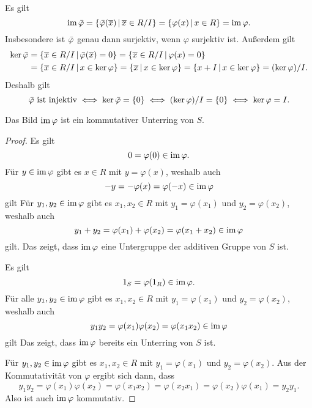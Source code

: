 \subsection{}

Es gilt
\[
    \operatorname{im} \bar{\varphi}
  = \{ \bar{\varphi}(\overline{x}) \,|\, \overline{x} \in R/I \}
  = \{ \varphi(x) \,|\, x \in R \}
  = \operatorname{im} \varphi.
\]
Insbesondere ist $\bar{\varphi}$ genau dann surjektiv, wenn $\varphi$ surjektiv ist.
Außerdem gilt
\begin{align*}
      \ker \bar{\varphi}
  &=  \{ \overline{x} \in R/I \,|\, \bar{\varphi}( \overline{x} ) = 0 \}
   =  \{ \overline{x} \in R/I \,|\, \varphi(x) = 0 \}
  \\
  &=  \{ \overline{x} \in R/I \,|\, x \in \ker \varphi \}
   =  \{ \overline{x} \,|\, x \in \ker \varphi \}
   =  \{ x + I \,|\, x \in \ker \varphi \}
   =  (\ker \varphi)/I.
\end{align*}
Deshalb gilt
\[
        \text{$\bar{\varphi}$ ist injektiv}
  \iff  \ker \bar{\varphi} = \{0\}
  \iff  (\ker \varphi)/I = \{0\}
  \iff  \ker \varphi = I.
\]

\begin{claim}
  Das Bild $\operatorname{im} \varphi$ ist ein kommutativer Unterring von $S$.
\end{claim}
\begin{proof}
  Es gilt
  \[
        0
    =   \varphi(0)
    \in \operatorname{im} \varphi.
  \]
  Für $y \in \operatorname{im} \varphi$ gibt es $x \in R$ mit $y = \varphi(x)$, weshalb auch
  \[
        -y
    =   -\varphi(x)
    =   \varphi(-x)
    \in \operatorname{im} \varphi
  \]
  gilt
  Für $y_1, y_2 \in \operatorname{im} \varphi$ gibt es $x_1, x_2 \in R$ mit $y_1 = \varphi(x_1)$ und $y_2 = \varphi(x_2)$, weshalb auch
  \[
        y_1 + y_2
    =   \varphi(x_1) + \varphi(x_2)
    =   \varphi(x_1 + x_2)
    \in \operatorname{im} \varphi
  \]
  gilt.
  Das zeigt, dass $\operatorname{im} \varphi$ eine Untergruppe der additiven Gruppe von $S$ ist.

  Es gilt
  \[
    1_S = \varphi(1_R) \in \operatorname{im} \varphi.
  \]
  Für alle $y_1, y_2 \in \operatorname{im} \varphi$ gibt es $x_1, x_2 \in R$ mit $y_1 = \varphi(x_1)$ und $y_2 = \varphi(x_2)$, weshalb auch
  \[
        y_1 y_2
    =   \varphi(x_1) \varphi(x_2)
    =   \varphi(x_1 x_2)
    \in \operatorname{im} \varphi
  \]
  gilt
  Das zeigt, dass $\operatorname{im} \varphi$ bereits ein Unterring von $S$ ist.
  
  Für $y_1, y_2 \in \operatorname{im} \varphi$ gibt es $x_1, x_2 \in R$ mit $y_1 = \varphi(x_1)$ und $y_2 = \varphi(x_2)$.
  Aus der Kommutativität von $\varphi$ ergibt sich dann, dass
  \[
      y_1 y_2
    = \varphi(x_1) \varphi(x_2)
    = \varphi(x_1 x_2)
    = \varphi(x_2 x_1)
    = \varphi(x_2) \varphi(x_1)
    = y_2 y_1.
  \]
  Also ist auch $\operatorname{im} \varphi$ kommutativ.
\end{proof}

